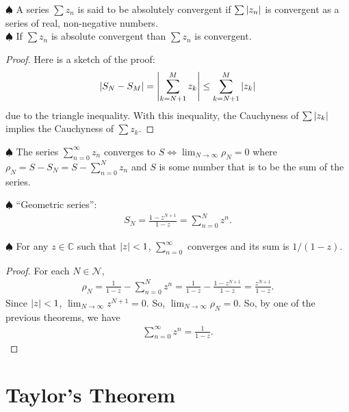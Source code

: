\documentclass{article}
\theoremstyle{definition}
\newcommand{\f}[2]{\frac{#1}{#2}}
\newcommand{\C}{\mathbb{C}}
\newcommand{\N}{\mathcal{N}}
\begin{document}
\noindent $\spadesuit$ A series $\sum z_n$ is said to be absolutely convergent if $\sum \abs{z_n}$ is convergent as a series of real, non-negative numbers. \\

\noindent $\spadesuit$ If $\sum z_n$ is absolute convergent than $\sum z_n$ is convergent. 

\begin{proof}
	Here is a sketch of the proof: 
	\begin{align}
	\abs{S_N - S_M} = \abs{\sum^M_{k = N+1} z_k} \leq \sum^M_{k = N+1}\abs{z_k}
	\end{align}
	due to the triangle inequality. With this inequality, the Cauchyness of $\sum\abs{z_k}$ implies the Cauchyness of $\sum z_k$.
\end{proof}



\noindent $\spadesuit$ The series $\sum^\infty_{n=0}z_n$ converges to $S \iff \lim_{N\to \infty} \rho_N = 0$ where $\rho_N = S - S_N = S - \sum^N_{n=0}z_n$ and $S$ is some number that is to be the sum of the series. 


\noindent $\spadesuit$ ``Geometric series'':
\begin{align}
S_N = \f{1 - z^{N+1}}{1-z} = \sum^N_{n=0} z^n.
\end{align} 


\noindent $\spadesuit$ For any $z\in \C$ such that $\abs{z} < 1$, $\sum^\infty_{n=0}$ converges and its sum is $1/(1-z)$. 

\begin{proof}
	For each $N \in \N$, 
	\begin{align}
	\rho_N = \f{1}{1-z} - \sum^N_{n=0}z^n = \f{1}{1-z} - \f{1 - z^{N+1}}{1-z} = \f{z^{N+1}}{1-z}.
	\end{align}
	Since $\abs{z} < 1$, $\lim_{N\to \infty} z^{N+1} = 0$. So, $\lim_{N \to \infty} \rho_N = 0$. So, by one of the previous theorems, we have
	\begin{align}
	\sum^\infty_{n=0} z^n = \f{1}{1-z}.
	\end{align}
\end{proof}






\section{Taylor's Theorem}
\end{document}
